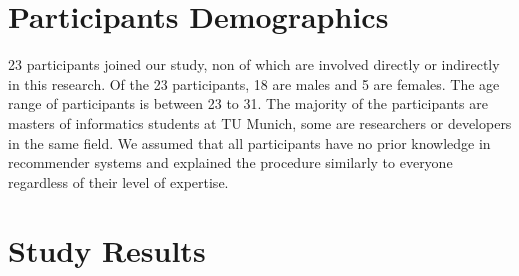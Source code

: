 \section{Participants Demographics}
23 participants joined our study, non of which are involved directly or
indirectly in this research.
Of the 23 participants, 18 are males and 5 are females. The age range of
participants is between 23 to 31. The majority of the participants are masters
of informatics students at TU Munich, some are researchers or developers in the
same field. We assumed that all participants have no prior knowledge in
recommender systems and explained the procedure similarly to everyone regardless
of their level of expertise.

\section{Study Results}



